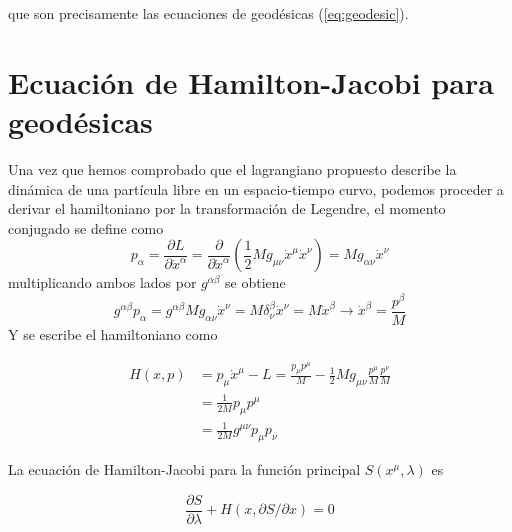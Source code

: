 que son precisamente las ecuaciones de geodésicas (\ref{eq:geodesic}).

\section{Ecuación de Hamilton-Jacobi para geodésicas}
Una vez que hemos comprobado que el lagrangiano propuesto describe la dinámica de una partícula libre en un espacio-tiempo curvo, podemos proceder a derivar el hamiltoniano por la transformación de Legendre, el momento conjugado se define como
\begin{equation}
p_\alpha=\frac{\partial L}{\partial \dot{x}^\alpha}=\frac{\partial }{\partial \dot{x}^\alpha}\left( \frac{1}{2} M g_{\mu \nu} \dot{x}^\mu \dot{x}^\nu\right)= M g_{\alpha \nu} \dot{x}^\nu
\end{equation}
multiplicando ambos lados por $g^{\alpha \beta}$ se obtiene
\begin{equation}
g^{\alpha \beta} p_\alpha = g^{\alpha \beta} M g_{\alpha \nu} \dot{x}^\nu = M \delta^\beta_\nu \dot{x}^\nu = M \dot{x}^\beta \rightarrow  \dot{x}^\beta= \frac{p^{\beta}}{M}
\end{equation}
Y se escribe el hamiltoniano como

\begin{equation}
\begin{aligned}
    H(x, p)&=p_\mu \dot{x}^\mu-L=  \frac{p_\mu p^{\mu}}{M} -\frac{1}{2} M g_{\mu \nu} \frac{p^{\mu}}{M} \frac{p^{\nu}}{M} \\
    &= \frac{1}{2M}  p_\mu p^{\mu}\\
    &= \frac{1}{2M} g^{\mu \nu} p_\mu p_\nu 
\end{aligned}
\end{equation}
 
La ecuación de Hamilton-Jacobi para la función principal $S\left(x^\mu, \lambda\right)$ es

\begin{equation}
\frac{\partial S}{\partial \lambda}+H(x, \partial S / \partial x)=0
\end{equation}

